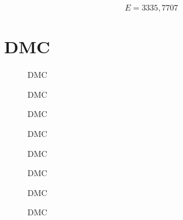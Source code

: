\begin{equation}
    E = 3335,7707
\end{equation}


\section{DMC}

\begin{figure}[H]
    \centering
    
    \caption{DMC}
\end{figure}

\begin{figure}[H]
    \centering
    
    \caption{DMC}
\end{figure}

\begin{figure}[H]
    \centering
    
    \caption{DMC}
\end{figure}

\begin{figure}[H]
    \centering
    
    \caption{DMC}
\end{figure}

\begin{figure}[H]
    \centering
    
    \caption{DMC}
\end{figure}

\begin{figure}[H]
    \centering
    
    \caption{DMC}
\end{figure}


\begin{figure}[H]
    \centering
    
    \caption{DMC}
\end{figure}

\begin{figure}[H]
    \centering
    
    \caption{DMC}
\end{figure}

